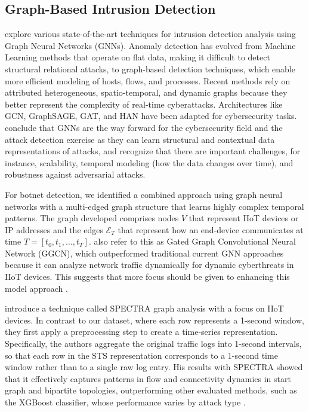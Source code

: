 \documentclass[final,5p,times,twocolumn]{elsarticle}
\begin{document}
\subsection{Graph-Based Intrusion Detection}

\cite{bilot2023graph} explore various state-of-the-art techniques for intrusion detection analysis using Graph Neural Networks (GNNs). Anomaly detection has evolved from Machine Learning methods that operate on flat data, making it difficult to detect structural relational attacks, to graph-based detection techniques, which enable more efficient modeling of hosts, flows, and processes. Recent methods rely on attributed heterogeneous, spatio-temporal, and dynamic graphs because they better represent the complexity of real-time cyberattacks. Architectures like GCN, GraphSAGE, GAT, and HAN have been adapted for cybersecurity tasks. \cite{bilot2023graph} conclude that GNNs are the way forward for the cybersecurity field and the attack detection exercise as they can learn structural and contextual data representations of attacks, and recognize that there are important challenges, for instance, scalability, temporal modeling (how the data changes over time), and robustness against adversarial attacks.

For botnet detection, we identified a combined approach using graph neural networks with a multi-edged graph structure that learns highly complex temporal patterns. The graph developed comprises nodes \(V\) that represent IIoT devices or IP addresses and the edges \(\mathcal{E}_T\) that represent how an end-device communicates at time \(T = [t_0, t_1, \ldots, t_T]\). \cite{altaf_gnn-based_2024} also refer to this as Gated Graph Convolutional Neural Network (GGCN), which outperformed traditional current GNN approaches because it can analyze network traffic dynamically for dynamic cyberthreats in IIoT devices. This suggests that more focus should be given to enhancing this model approach \citep{altaf_gnn-based_2024}.

\cite{jaber_spectral_2025} introduce a technique called SPECTRA graph analysis with a focus on IIoT devices. In contrast to our dataset, where each row represents a 1-second window, they first apply a preprocessing step to create a time-series representation. Specifically, the authors aggregate the original traffic logs into 1-second intervals, so that each row in the STS representation corresponds to a 1-second time window rather than to a single raw log entry. His results with SPECTRA showed that it effectively captures patterns in flow and connectivity dynamics in start graph and bipartite topologies, outperforming other evaluated methods, such as the XGBoost classifier, whose performance varies by attack type \citep{jaber_spectral_2025}.
\end{document}

